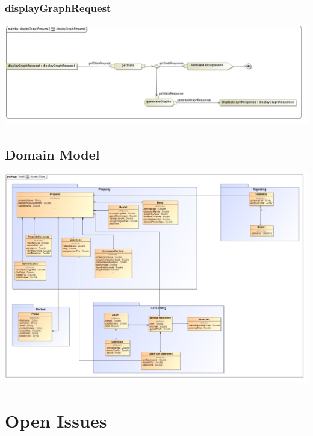 \documentclass[a4paper,12pt]{article}
\begin{document}
\subsubsection{displayGraphRequest}
\includegraphics[width=1\textwidth]{./Images/processSpecification/displayGraphRequestActivity.jpg}


\subsection{Domain Model}
\includegraphics[width=1\textwidth]{./domainModel/domain_Model.PNG}


\newpage
\section{Open Issues}
\end{document}
